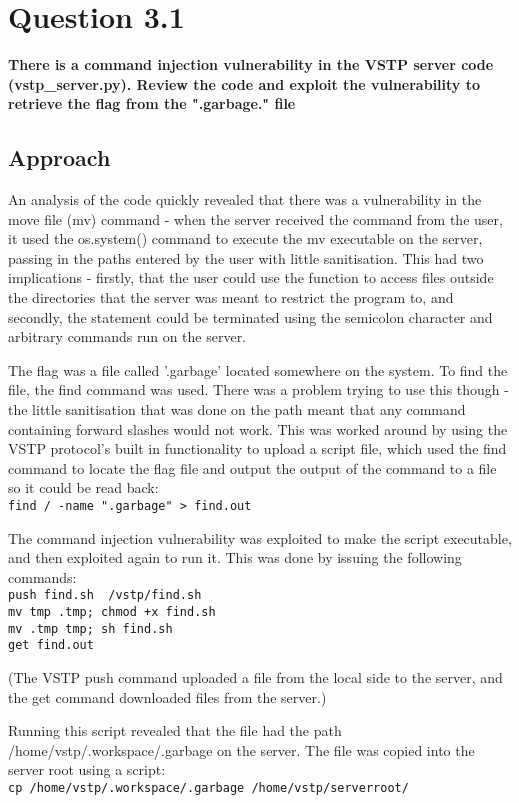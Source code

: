 \section{Question 3.1}
\textbf{There is a command injection vulnerability in the VSTP server code
(vstp\_server.py). Review the code and exploit the vulnerability to retrieve the
flag from the ".garbage." file}
\subsection{Approach}
An analysis of the code quickly revealed that there was a vulnerability in the
move file (mv) command - when the server received the command from the user,
it used the os.system() command to execute the mv executable on the server,
passing in the paths entered by the user with little sanitisation. This had
two implications - firstly, that the user could use the function to access
files outside the directories that the server was meant to restrict the
program to, and secondly, the statement could be terminated using the
semicolon character and arbitrary commands run on the server.

The flag was a file called '.garbage' located somewhere on the system. To find
the file, the find command was used. There was a problem trying to use this
though - the little sanitisation that was done on the path meant that any
command containing forward slashes would not work. This was worked around
by using the VSTP protocol's built in functionality to upload a script file,
which used the find command to locate the flag file and output the output of
the command to a file so it could be read back:
\\
\texttt{find / -name ".garbage" > find.out}

The command injection vulnerability was exploited to make the script 
executable, and then exploited again to run it. This was done by issuing
the following commands:
\\
\texttt{push find.sh ~/vstp/find.sh}
\\
\texttt{mv tmp .tmp; chmod +x find.sh}
\\
\texttt{mv .tmp tmp; sh find.sh}
\\
\texttt{get find.out}

(The VSTP push command uploaded a file from the local side to the server, and
the get command downloaded files from the server.)

Running this script revealed that the file had the path
/home/vstp/.workspace/.garbage on the server. The file was copied into the
server root using a script:
\\
\texttt{cp /home/vstp/.workspace/.garbage /home/vstp/serverroot/}


